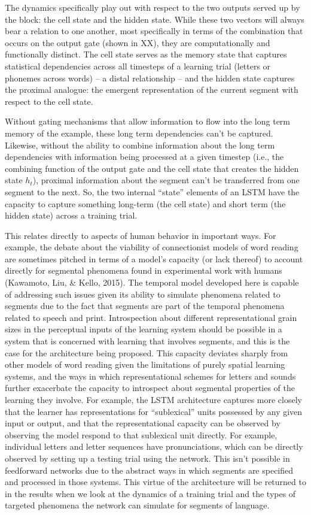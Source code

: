 \documentclass[
  american,
  man,floatsintext]{apa6}
\begin{document}
The dynamics specifically play out with respect to the two outputs served up by the block: the cell state and the hidden state. While these two vectors will always bear a relation to one another, most specifically in terms of the combination that occurs on the output gate (shown in XX), they are computationally and functionally distinct. The cell state serves as the memory state that captures statistical dependencies across all timesteps of a learning trial (letters or phonemes across words) -- a distal relationship -- and the hidden state captures the proximal analogue: the emergent representation of the current segment with respect to the cell state.

Without gating mechanisms that allow information to flow into the long term memory of the example, these long term dependencies can't be captured. Likewise, without the ability to combine information about the long term dependencies with information being processed at a given timestep (i.e., the combining function of the output gate and the cell state that creates the hidden state \(h_t\)), proximal information about the segment can't be transferred from one segment to the next. So, the two internal ``state'' elements of an LSTM have the capacity to capture something long-term (the cell state) and short term (the hidden state) across a training trial.

This relates directly to aspects of human behavior in important ways. For example, the debate about the viability of connectionist models of word reading are sometimes pitched in terms of a model's capacity (or lack thereof) to account directly for segmental phenomena found in experimental work with humans (Kawamoto, Liu, \& Kello, 2015). The temporal model developed here is capable of addressing such issues given its ability to simulate phenomena related to segments due to the fact that segments are part of the temporal phenomena related to speech and print. Introspection about different representational grain sizes in the perceptual inputs of the learning system should be possible in a system that is concerned with learning that involves segments, and this is the case for the architecture being proposed. This capacity deviates sharply from other models of word reading given the limitations of purely spatial learning systems, and the ways in which representational schemes for letters and sounds further exacerbate the capacity to introspect about segmental properties of the learning they involve. For example, the LSTM architecture captures more closely that the learner has representations for ``sublexical'' units possessed by any given input or output, and that the representational capacity can be observed by observing the model respond to that sublexical unit directly. For example, individual letters and letter sequences have pronunciations, which can be directly observed by setting up a testing trial using the network. This isn't possible in feedforward networks due to the abstract ways in which segments are specified and processed in those systems. This virtue of the architecture will be returned to in the results when we look at the dynamics of a training trial and the types of targeted phenomena the network can simulate for segments of language.
\end{document}
